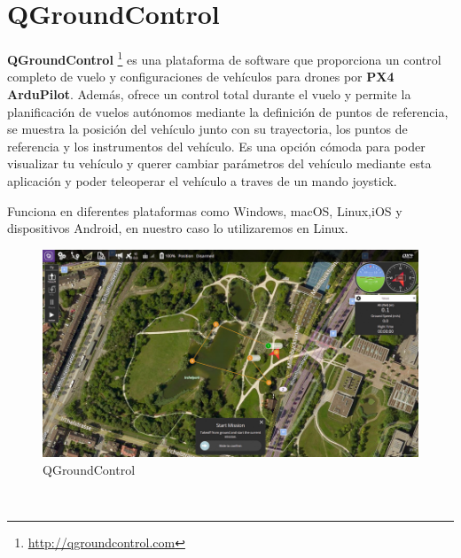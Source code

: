 \section{QGroundControl}
\label{sec:QGroundControl} 

\textbf{QGroundControl} \footnote{\url{http://qgroundcontrol.com}} es una plataforma de software que proporciona un control completo de vuelo 
y configuraciones de vehículos para drones por \textbf{PX4 ArduPilot}. Además, ofrece un control total durante el vuelo y permite la planificación de vuelos autónomos 
mediante la definición de puntos de referencia, se muestra la posición del vehículo junto con su trayectoria, los puntos de referencia y los instrumentos del vehículo. 
Es una opción cómoda para poder visualizar tu vehículo y querer cambiar parámetros del vehículo mediante esta aplicación y poder teleoperar el vehículo a traves de un mando joystick. \newline

Funciona en diferentes plataformas como Windows, macOS, Linux,iOS y dispositivos Android, en nuestro caso lo utilizaremos en Linux. 

\begin{figure} [h]
  \begin{center}
    \includegraphics[scale=1.2]{figs/Plataformas_Desarollo/software-qgc.jpg}
  \end{center}
  \caption{QGroundControl}
  \label{fig:QGroundControl}
\end{figure}\


































